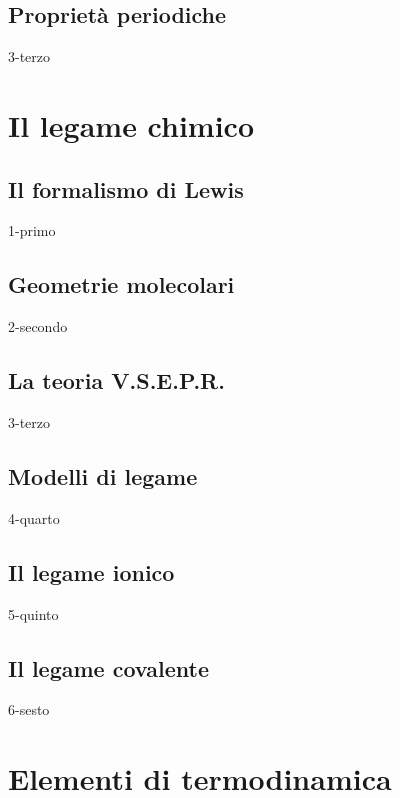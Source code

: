 \documentclass[openany,12pt]{book}%
\begin{document}
\newpage

\section{Proprietà periodiche}
{3-terzo}

\chapter{Il legame chimico}

\section{Il formalismo di Lewis}
{1-primo}

\newpage

\section{Geometrie molecolari}
{2-secondo}

\newpage

\section{La teoria V.S.E.P.R.}
{3-terzo}

\newpage

\section{Modelli di legame}
{4-quarto}

\newpage

\section{Il legame ionico}
{5-quinto}

\newpage

\section{Il legame covalente}
{6-sesto}

\chapter{Elementi di termodinamica}
\end{document}
